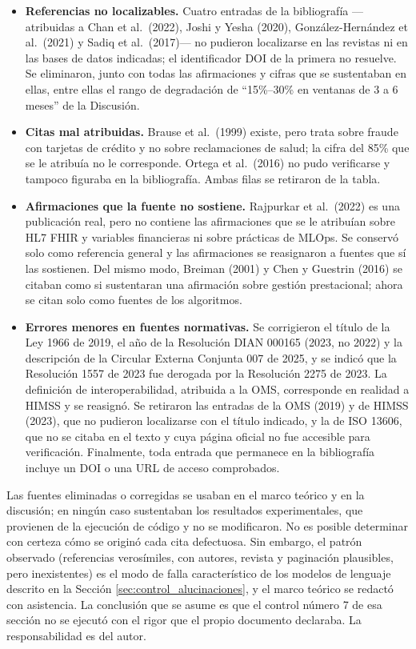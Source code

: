 \documentclass[12pt,letterpaper]{report}
\begin{document}
\begin{itemize}
    \item \textbf{Referencias no localizables.} Cuatro entradas de la bibliografía
    —atribuidas a Chan et al.\ (2022), Joshi y Yesha (2020), González-Hernández et al.\
    (2021) y Sadiq et al.\ (2017)— no pudieron localizarse en las revistas ni en las
    bases de datos indicadas; el identificador DOI de la primera no resuelve. Se
    eliminaron, junto con todas las afirmaciones y cifras que se sustentaban en ellas,
    entre ellas el rango de degradación de ``15\%--30\% en ventanas de 3 a 6 meses''
    de la Discusión.
    \item \textbf{Citas mal atribuidas.} Brause et al.\ (1999) existe, pero trata sobre
    fraude con tarjetas de crédito y no sobre reclamaciones de salud; la cifra del 85\%
    que se le atribuía no le corresponde. Ortega et al.\ (2016) no pudo verificarse y
    tampoco figuraba en la bibliografía. Ambas filas se retiraron de la tabla.
    \item \textbf{Afirmaciones que la fuente no sostiene.} Rajpurkar et al.\ (2022)
    es una publicación real, pero no contiene las afirmaciones que se le atribuían
    sobre HL7 FHIR y variables financieras ni sobre prácticas de MLOps. Se conservó
    solo como referencia general y las afirmaciones se reasignaron a fuentes que sí
    las sostienen. Del mismo modo, Breiman (2001) y Chen y Guestrin (2016) se citaban
    como si sustentaran una afirmación sobre gestión prestacional; ahora se citan solo
    como fuentes de los algoritmos.
    \item \textbf{Errores menores en fuentes normativas.} Se corrigieron el título de la
    Ley 1966 de 2019, el año de la Resolución DIAN 000165 (2023, no 2022) y la
    descripción de la Circular Externa Conjunta 007 de 2025, y se indicó que la
    Resolución 1557 de 2023 fue derogada por la Resolución 2275 de 2023. La definición
    de interoperabilidad, atribuida a la OMS, corresponde en realidad a HIMSS y se
    reasignó. Se retiraron las entradas de la OMS (2019) y de HIMSS (2023), que no
    pudieron localizarse con el título indicado, y la de ISO 13606, que no se citaba en
    el texto y cuya página oficial no fue accesible para verificación. Finalmente,
    toda entrada que permanece en la bibliografía incluye un DOI o una URL de acceso
    comprobados.
\end{itemize}

Las fuentes eliminadas o corregidas se usaban en el marco teórico y en la discusión; en
ningún caso sustentaban los resultados experimentales, que provienen de la ejecución
de código y no se modificaron. No es posible determinar con certeza cómo se originó
cada cita defectuosa. Sin embargo, el patrón observado (referencias verosímiles, con
autores, revista y paginación plausibles, pero inexistentes) es el modo de falla
característico de los modelos de lenguaje descrito en la
Sección \ref{sec:control_alucinaciones}, y el marco teórico se redactó con asistencia.
La conclusión que se asume es que el control número 7 de esa sección no se ejecutó con
el rigor que el propio documento declaraba. La responsabilidad es del autor.
\end{document}
